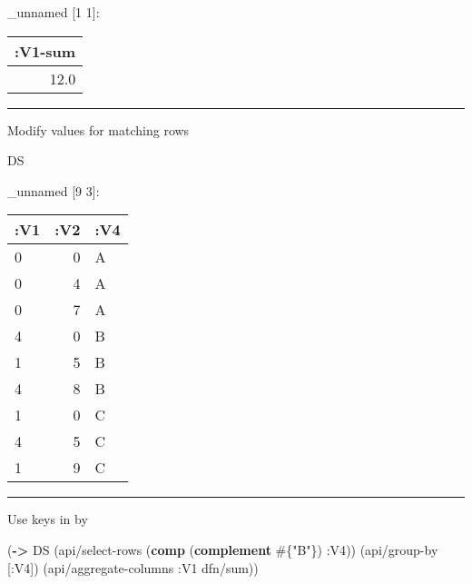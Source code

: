\documentclass[]{article}
\newenvironment{Shaded}{\begin{snugshade}}{\end{snugshade}}
\newcommand{\KeywordTok}[1]{\textcolor[rgb]{0.13,0.29,0.53}{\textbf{#1}}}
\newcommand{\DecValTok}[1]{\textcolor[rgb]{0.00,0.00,0.81}{#1}}
\newcommand{\StringTok}[1]{\textcolor[rgb]{0.31,0.60,0.02}{#1}}
\newcommand{\FunctionTok}[1]{\textcolor[rgb]{0.00,0.00,0.00}{#1}}
\newcommand{\VariableTok}[1]{\textcolor[rgb]{0.00,0.00,0.00}{#1}}
\newcommand{\BuiltInTok}[1]{#1}
\newcommand{\AttributeTok}[1]{\textcolor[rgb]{0.77,0.63,0.00}{#1}}
\newcommand{\NormalTok}[1]{#1}
\begin{document}
\_unnamed {[}1 1{]}:

\begin{longtable}[]{@{}r@{}}
\toprule
:V1-sum\tabularnewline
\midrule
\endhead
12.0\tabularnewline
\bottomrule
\end{longtable}

\begin{center}\rule{0.5\linewidth}{0.5pt}\end{center}

Modify values for matching rows

\begin{Shaded}
\end{Shaded}

\begin{Shaded}
\begin{Highlighting}[]
\NormalTok{DS}
\end{Highlighting}
\end{Shaded}

\_unnamed {[}9 3{]}:

\begin{longtable}[]{@{}lrl@{}}
\toprule
:V1 & :V2 & :V4\tabularnewline
\midrule
\endhead
0 & 0 & A\tabularnewline
0 & 4 & A\tabularnewline
0 & 7 & A\tabularnewline
4 & 0 & B\tabularnewline
1 & 5 & B\tabularnewline
4 & 8 & B\tabularnewline
1 & 0 & C\tabularnewline
4 & 5 & C\tabularnewline
1 & 9 & C\tabularnewline
\bottomrule
\end{longtable}

\begin{center}\rule{0.5\linewidth}{0.5pt}\end{center}

Use keys in by

\begin{Shaded}
\begin{Highlighting}[]
\NormalTok{(}\KeywordTok{->}\NormalTok{ DS}
\NormalTok{    (api/select-rows (}\KeywordTok{comp}\NormalTok{ (}\KeywordTok{complement}\NormalTok{ #\{}\StringTok{"B"}\NormalTok{\}) }\AttributeTok{:V4}\NormalTok{))}
\NormalTok{    (api/group-by [}\AttributeTok{:V4}\NormalTok{])}
\NormalTok{    (api/aggregate-columns }\AttributeTok{:V1}\NormalTok{ dfn/sum))}
\end{Highlighting}
\end{Shaded}
\end{document}
